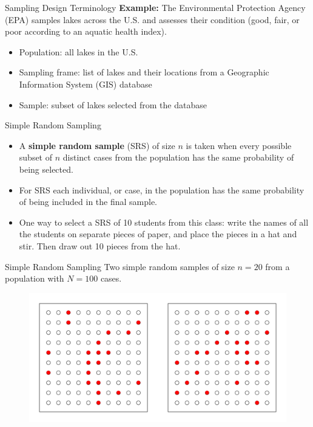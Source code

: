 \documentclass{beamer}
\begin{document}
\begin{frame}{Sampling Design Terminology}
\textbf{Example:} The Environmental Protection Agency (EPA) samples lakes across the U.S. and assesses their condition (good, fair, or poor according to an aquatic health index).
\begin{itemize}
\item Population: all lakes in the U.S.
\item Sampling frame:  list of lakes and their locations from a Geographic Information System (GIS) database
\item Sample: subset of lakes selected from the database     
\end{itemize}
\end{frame}

\begin{frame}{Simple Random Sampling}
\begin{itemize}
\item A \textbf{simple random sample} (SRS) of size $n$ is taken when every possible subset of $n$ distinct cases from the population has the same probability of being selected. 
\vspace{5pt}
\item For SRS each individual, or case, in the population has the same probability of being included in the final sample.
\vspace{5pt}
\item One way to select a SRS of 10 students from this class: write the names of all the students on separate pieces of paper, and place the pieces in a hat and stir.  Then draw out 10 pieces from the hat. 
\end{itemize}
\end{frame}

\begin{frame}{Simple Random Sampling}
Two simple random samples of size $n=20$ from a population with $N=100$ cases.\\
\begin{figure}
\includegraphics[scale=0.4]{figure/srs.pdf}
\end{figure}
\end{frame}
\end{document}
